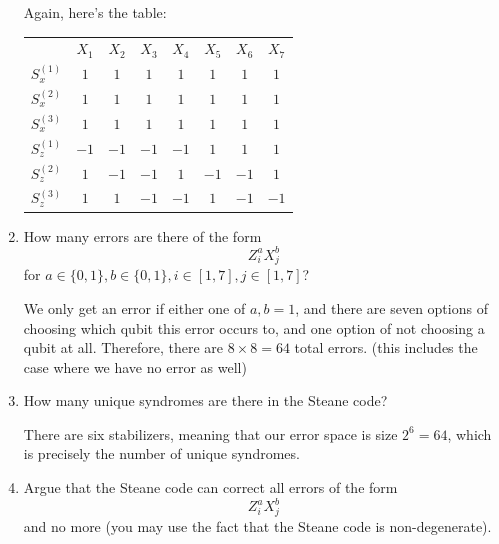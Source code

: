 \documentclass[10pt]{article}
\begin{document}
\begin{enumerate}[label=\alph*)]
			\begin{solution}
				Again, here's the table:
					\begin{center}
					\begin{tabular}{c|c|c|c|c|c|c|c}
						&  \( X_1 \) & \( X_2 \) & \( X_3 \) & \( X_4 \) & \( X_5 \) & \( X_6 \) & \( X_7 \) \\
						\( S_x^{(1)} \) & \( 1 \) & \( 1 \) & \( 1 \) & \( 1 \) & \( 1 \) & \( 1 \) & \( 1 \)\\
						\( S_x^{(2)} \) & \( 1 \) & \( 1 \) & \( 1 \) & \( 1 \) & \( 1 \) & \( 1 \) & \( 1 \)\\
						\( S_x^{(3)} \) & \( 1 \) & \( 1 \) & \( 1 \) & \( 1 \) & \( 1 \) & \( 1 \) & \( 1 \)\\
						\( S_z^{(1)} \) & \( -1 \) & \( -1 \) & \( -1 \) & \( -1 \) & \( 1 \) & \( 1 \) & $1$ \\
						\( S_z^{(2)} \) & \( 1 \) & \( -1 \) &  \( -1 \) & \( 1 \) & \( -1 \) & \( -1 \) & \( 1 \) \\
						\( S_z^{(3)} \) & \( 1 \) & \( 1 \) & \( -1 \) &  \( -1 \) & \( 1 \) & \( -1  \) & \( -1 \)
					\end{tabular}
				\end{center}
			\end{solution}
		\item How many errors are there of the form 
			\[
			Z_i^{a}X_j^{b} 
			\] 
			for \( a \in \{0, 1\} , b \in \{0, 1\} , i \in [1, 7], j \in [1, 7] \)?

			\begin{solution}
				We only get an error if either one of  \( a, b = 1 \), and there are seven options of choosing 
				which qubit this error occurs to, and one option of not choosing a qubit at all. Therefore, there are 
				\( 8 \times 8 = 64 \) total errors. (this includes the case where we have no error as well)
			\end{solution}
		\item How many unique syndromes are there in the Steane code? 

			\begin{solution}
				There are six stabilizers, meaning that our error space is size \( 2^{6} = 64 \), which is precisely 
				the number of unique syndromes. 
			\end{solution}
		\item Argue that the Steane code can correct all errors of the form 
			\[
			Z_i^{a}X_j^{b}
			\] 
			and no more (you may use the fact that the Steane code is non-degenerate).


\end{enumerate}
\end{document}
